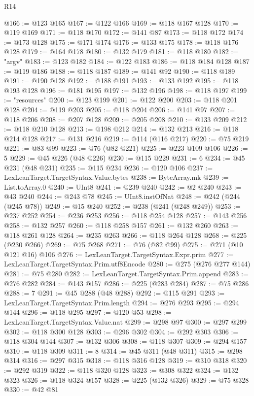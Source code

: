 \begin{lexlean}{R14}
\begin{coremodule}
@166 := @123 @165
@167 := @122 @166
@169 := @118 @167 @128
@170 := @119 @169
@171 := @118 @170
@172 := @141 @87
@173 := @118 @172
@174 := @173 @128
@175 := @171 @174
@176 := @133 @175
@178 := @118 @176 @128
@179 := @164 @178
@180 := @132 @179
@181 := @118 @180
@182 := "argv"
@183 := @123 @182
@184 := @122 @183
@186 := @118 @184 @128
@187 := @119 @186
@188 := @118 @187
@189 := @141 @92
@190 := @118 @189
@191 := @190 @128
@192 := @188 @191
@193 := @133 @192
@195 := @118 @193 @128
@196 := @181 @195
@197 := @132 @196
@198 := @118 @197
@199 := "resources"
@200 := @123 @199
@201 := @122 @200
@203 := @118 @201 @128
@204 := @119 @203
@205 := @118 @204
@206 := @141 @97
@207 := @118 @206
@208 := @207 @128
@209 := @205 @208
@210 := @133 @209
@212 := @118 @210 @128
@213 := @198 @212
@214 := @132 @213
@216 := @118 @214 @128
@217 := @131 @216
@219 := @114 (@116 @217)
@220 := @75 @219
@221 := @83 @99
@223 := @76 (@82 @221)
@225 := @223 @109 @106
@226 := 5
@229 := @45 @226 (@48 @226)
@230 := @115 @229
@231 := 6
@234 := @45 @231 (@48 @231)
@235 := @115 @234
@236 := @120 @106
@237 := LexLeanTarget.TargetSyntax.Value.bytes
@238 := ByteArray.mk
@239 := List.toArray.{0}
@240 := UInt8
@241 := @239 @240
@242 := @2 @240
@243 := @43 @240
@244 := @243 @78
@245 := UInt8.instOfNat
@248 := @242 (@244 (@245 @78))
@249 := @15 @240
@252 := @238 (@241 (@248 @249))
@253 := @237 @252
@254 := @236 @253
@256 := @118 @254 @128
@257 := @143 @256
@258 := @132 @257
@260 := @118 @258 @157
@261 := @132 @260
@263 := @118 @261 @128
@264 := @235 @263
@266 := @118 @264 @128
@268 := @225 (@230 @266)
@269 := @75 @268
@271 := @76 (@82 @99)
@275 := @271 (@10 @121 @16) @106
@276 := LexLeanTarget.TargetSyntax.Expr.prim
@277 := LexLeanTarget.TargetSyntax.Prim.utf8Encode
@280 := @275 (@276 @277 @144)
@281 := @75 @280
@282 := LexLeanTarget.TargetSyntax.Prim.append
@283 := @276 @282
@284 := @143 @157
@286 := @225 (@283 @284)
@287 := @75 @286
@288 := 7
@291 := @45 @288 (@48 @288)
@292 := @115 @291
@293 := LexLeanTarget.TargetSyntax.Prim.length
@294 := @276 @293
@295 := @294 @144
@296 := @118 @295
@297 := @120 @53
@298 := LexLeanTarget.TargetSyntax.Value.nat
@299 := @298 @97
@300 := @297 @299
@302 := @118 @300 @128
@303 := @296 @302
@304 := @292 @303
@306 := @118 @304 @144
@307 := @132 @306
@308 := @118 @307
@309 := @294 @157
@310 := @118 @309
@311 := 8
@314 := @45 @311 (@48 @311)
@315 := @298 @314
@316 := @297 @315
@318 := @118 @316 @128
@319 := @310 @318
@320 := @292 @319
@322 := @118 @320 @128
@323 := @308 @322
@324 := @132 @323
@326 := @118 @324 @157
@328 := @225 (@132 @326)
@329 := @75 @328
@330 := @42 @81

\end{coremodule}
\end{lexlean}
